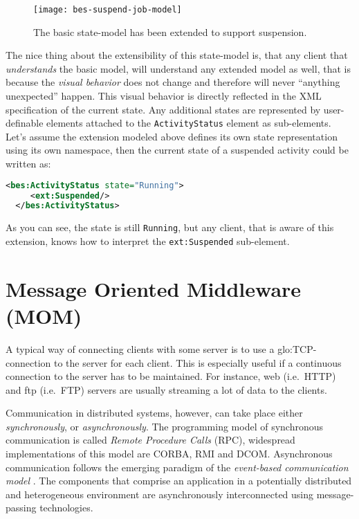 \begin{figure}[h]
  \centering
  \texttt{[image: bes-suspend-job-model]}
  \caption[Extended  BES Job-State-Model]{The  basic state-model  has been
    extended to support suspension.}
  \label{fig:bes-suspend-model}
\end{figure}

The nice  thing about the extensibility  of this state-model  is, that any
client  that  \emph{understands}  the  basic model,  will  understand  any
extended model  as well, that  is because the \emph{visual  behavior} does
not change  and therefore will never ``anything  unexpected'' happen. This
visual  behavior is  directly reflected  in the  XML specification  of the
current state.   Any additional  states are represented  by user-definable
elements attached to  the \texttt{ActivityStatus} element as sub-elements.
Let's  assume   the  extension  modeled   above  defines  its   own  state
representation  using its  own  namespace,  then the  current  state of  a
suspended activity could be written as:

\begin{lstlisting}[language=XML]
  <bes:ActivityStatus state="Running">
     <ext:Suspended/>
  </bes:ActivityStatus>
\end{lstlisting}

As you can see, the state  is still \texttt{Running}, but any client, that
is   aware    of   this   extension,   knows   how    to   interpret   the
\texttt{ext:Suspended} sub-element.

\section[Message Oriented Middleware]{Message Oriented Middleware (MOM)}
\label{sec:basic-communcation-architecture}

A  typical  way  of connecting  clients  with  some  server  is to  use  a
\gls{glo:TCP}-connection to the server for each client. This is especially
useful if a continuous connection to  the server has to be maintained. For
instance, web (i.e.~HTTP) and ftp (i.e.~FTP) servers are usually streaming
a lot of data to the clients.

Communication  in  distributed systems,  however,  can  take place  either
\emph{synchronously}, or  \emph{asynchronously}. The programming  model of
synchronous communication  is called \emph{Remote  Procedure Calls} (RPC),
widespread  implementations  of  this  model  are  CORBA,  RMI  and  DCOM.
Asynchronous   communication  follows   the  emerging   paradigm   of  the
\emph{event-based  communication  model}  \cite{MeCa:2005:Taxonomy}.   The
components that  comprise an application in a  potentially distributed and
heterogeneous   environment   are   asynchronously  interconnected   using
message-passing technologies.

